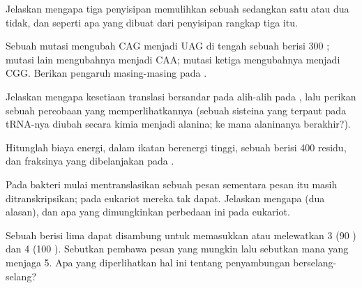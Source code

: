 \begin{exercise}[$\star\star$]\label{exo:b1:gene-expression:6}
Jelaskan mengapa tiga penyisipan memulihkan  sebuah 
sedangkan satu atau dua tidak, dan seperti apa  yang dibuat dari
penyisipan rangkap tiga itu.
\end{exercise}

\begin{exercise}[$\star\star$]\label{exo:b1:gene-expression:7}
Sebuah mutasi mengubah  CAG menjadi UAG di tengah sebuah 
berisi \qty{300}{} ; mutasi lain mengubahnya menjadi CAA; mutasi
ketiga mengubahnya menjadi CGG. Berikan pengaruh masing-masing pada
.
\end{exercise}

\begin{exercise}[$\star\star$]\label{exo:b1:gene-expression:8}
Jelaskan mengapa kesetiaan translasi bersandar pada  alih-alih pada , lalu perikan sebuah percobaan
yang memperlihatkannya (sebuah sisteina yang terpaut pada tRNA-nya
diubah secara kimia menjadi alanina; ke mana alaninanya berakhir?).
\end{exercise}

\begin{exercise}[$\star\star$]\label{exo:b1:gene-expression:9}
Hitunglah biaya energi, dalam ikatan berenergi tinggi, sebuah 
berisi \qty{400}{} residu, dan fraksinya yang dibelanjakan pada
.
\end{exercise}

\begin{exercise}[$\star\star\star$]\label{exo:b1:gene-expression:10}
Pada bakteri  mulai mentranslasikan sebuah pesan sementara pesan
itu masih ditranskripsikan; pada eukariot mereka tak dapat. Jelaskan
mengapa (dua alasan), dan apa yang dimungkinkan perbedaan ini pada
eukariot.
\end{exercise}

\begin{exercise}[$\star\star\star$]\label{exo:b1:gene-expression:11}
Sebuah  berisi lima  dapat disambung untuk memasukkan atau
melewatkan  3 (\qty{90}{} ) dan  4 (\qty{100}{}
). Sebutkan pembawa pesan yang mungkin lalu sebutkan mana
yang menjaga   5. Apa yang diperlihatkan hal ini
tentang penyambungan berselang-selang?
\end{exercise}

